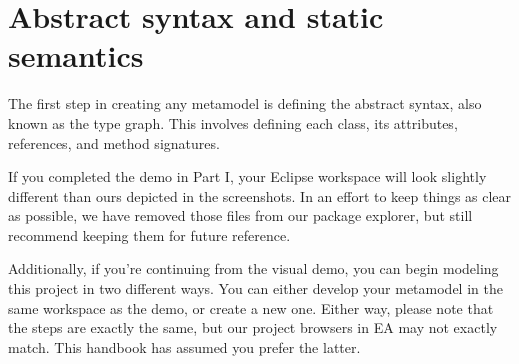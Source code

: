 \newpage
\section{Abstract syntax and static semantics}
\genHeader
\label{sec: staticSemantics}

The first step in creating any metamodel is defining the abstract syntax, also known as the type graph. This involves defining each class, its attributes,
references, and method signatures.

If you completed the demo in Part I, your Eclipse workspace will look slightly different than ours depicted in the screenshots. In an effort to keep things as
clear as possible, we have removed those files from our package explorer, but still recommend keeping them for future reference. 

Additionally, if you're continuing from the visual demo, you can begin modeling this project in two different ways. You can either develop your metamodel in
the same workspace as the demo, or create a new one. Either way, please note that the steps are exactly the same, but our project browsers in
EA may not exactly match. This handbook has assumed you prefer the latter.
















 
